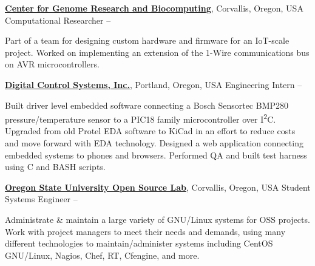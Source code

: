 \documentclass[letterpaper,MMMyyyy,nonstop]{simpleresumecv}
\begin{document}
\begin{body}
\href{http://cgrb.oregonstate.edu/}
{\textbf{Center for Genome Research and Biocomputing}},
Corvallis, Oregon, USA
\GapNoBreak
\BulletItem
Computational Researcher
\hfill
{} --
\begin{detail}
\SubBulletItem
Part of a team for designing custom hardware and firmware for an IoT-scale project.
\SubBulletItem
Worked on implementing an extension of the 1-Wire communications bus on AVR microcontrollers.
\end{detail}

\href{http://www.dcs-inc.net}
{\textbf{Digital Control Systems, Inc.}},
Portland, Oregon, USA
\GapNoBreak
\BulletItem
Engineering Intern
\hfill
{} --
\begin{detail}
\SubBulletItem
Built driver level embedded software connecting a Bosch Sensortec BMP280 pressure/temperature sensor to a PIC18 family microcontroller over I\textsuperscript{2}C.
\SubBulletItem
Upgraded from old Protel EDA software to KiCad in an effort to reduce costs and move forward with EDA technology.
\SubBulletItem
Designed a web application connecting embedded systems to phones and browsers. Performed QA and built test harness using C and BASH scripts.
\end{detail}

\href{http://www.osuosl.org}
{\textbf{Oregon State University Open Source Lab}},
Corvallis, Oregon, USA
\GapNoBreak
\BulletItem
Student Systems Engineer
\hfill
{} --
\begin{detail}
\SubBulletItem
Administrate \& maintain a large variety of GNU/Linux systems for OSS projects.
\SubBulletItem
Work with project managers to meet their needs and demands, using many different technologies to maintain/administer systems including CentOS GNU/Linux, Nagios, Chef, RT, Cfengine, and more.
\end{detail}

\iffalse
\href{http://www.dcs-inc.net}
{\textbf{Digital Control Systems, Inc.}},
Portland, Oregon, USA
\GapNoBreak
\BulletItem
Web Developer
\hfill
\DatestampYMD{2015}{06}{29} --
\DatestampYMD{2015}{09}{16}
\begin{detail}
\SubBulletItem
Developed a custom web application used for data collection and presentation of sensor data collected from various embedded systems in an Internet of Things control systems project.
\SubBulletItem
Engineered a database schema to be scalable with many different embedded devices and sensors.
\SubBulletItem
Used Python with the Web2Py framework in addition to Linux, PostgreSQL, HTML5 and Bootstrap CSS.
\end{detail}
\fi


\end{body}
\end{document}
